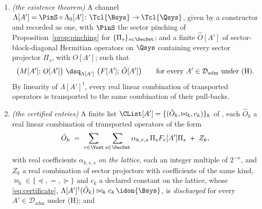 \begin{definition}
\begin{enumerate}[label=(I\arabic*),leftmargin=3.0em]
  with that label in its place: every factor of every $\Hs{\Qsys_s}$ is that
  party's, because the handed model lives on the system \emph{that} party
  receives. Where no label is declared the label is Bob's. Nothing else in
  the instance depends on the label: it is a declared identifier, compared
  and never computed, and no condition of (I1)--(I4) reads it.
\item \emph{(the existence theorem)} A channel
  $\Lambda[A']=\PinS\circ\Lambda_0[A']\colon\Tcl{\Bsys}\to\Tcl{\Qsys}$,
  given by a constructor and recorded as one, with $\PinS$ the sector
  pinching of Proposition~\ref{prop:pinching} for $\{\Pi_s\}_{s\in\SecSet}$;
  and a finite
  $\hat O[A']$ of sector-block-diagonal Hermitian operators on $\Qsys$
  containing every sector projector $\Pi_s$, with
   $O[A']$; such that
  \begin{equation}\label{eq:instance-relation}
    \big(M[A'];\,O[A']\big)\ \dsq_{\Lambda[A']}\ \big(F[A'];\,\hat O[A']\big)
    \qquad\text{for every }A'\in\mathcal{D}_{\mathrm{adm}}\text{ under (H)}.
  \end{equation}
  By linearity of $\Lambda[A']^{\dagger}$, every real linear combination of
  transported operators is transported to the same combination of their
  pull-backs.
\item \emph{(the certified entries)} A finite list
  $\CList[A']=\{(\hat O_k,\bowtie_k,c_k)\}_{k}$ of
  ,
  each $\hat O_k$ a real linear combination of transported operators of the
  form
  \begin{equation}\label{eq:instance-entry}
    \hat O_k\;=\;\sum_{v\in\Vset}\sum_{s\in\SecSet}
      \alpha_{k,v,s}\,\Pi_sF_v[A']\Pi_s\;+\;Z_k ,
  \end{equation}
  with real coefficients $\alpha_{k,v,s}$ \emph{on the lattice}, each an
  integer multiple of $2^{-\kappa}$, and $Z_k$ a real combination of sector
  projectors with coefficients of the same kind, $\bowtie_k\in\{\preceq,=,\succeq\}$
  and $c_k$ a declared constant on the lattice, whose 
  \eqref{eq:certificate},
  $\Lambda[A']^{\dagger}(\hat O_k)\bowtie_kc_k\,\idon{\Bsys}$, is
  \emph{discharged} for every $A'\in\mathcal{D}_{\mathrm{adm}}$ under (H); and

\end{enumerate}
\end{definition}
